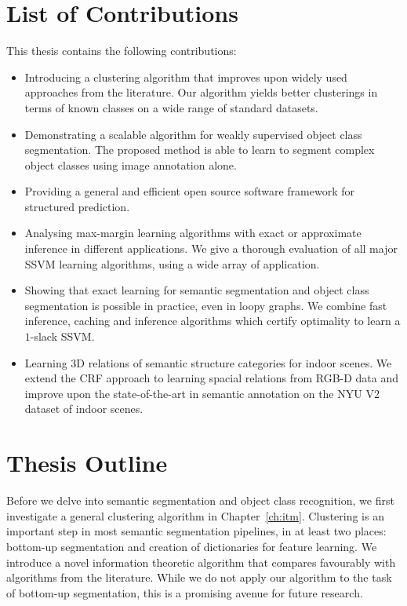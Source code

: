 \section{List of Contributions}
This thesis contains the following contributions:
\begin{itemize}
\item Introducing a clustering algorithm that improves upon widely used
    approaches from the literature. Our algorithm yields better clusterings in
    terms of known classes on a wide range of standard datasets.
\item Demonstrating a scalable algorithm for weakly supervised object class
    segmentation.  The proposed method is able to learn to segment complex object
    classes using image annotation alone.
\item Providing a general and efficient open source software framework for
    structured prediction. 
\item Analysing max-margin learning algorithms with exact or approximate
    inference in different applications. We give a thorough evaluation of
    all major SSVM learning algorithms, using a wide array of application.
\item Showing that exact learning for semantic segmentation and object class
    segmentation is possible in practice, even in loopy graphs. We combine
    fast inference, caching and inference algorithms which certify optimality
    to learn a $1$-slack SSVM.
\item Learning 3D relations of semantic structure categories for indoor scenes.
    We extend the CRF approach to learning spacial relations from RGB-D data and
    improve upon the state-of-the-art in semantic annotation on the NYU V2 dataset
    of indoor scenes.
\end{itemize}

\section{Thesis Outline}
Before we delve into semantic segmentation and object class recognition, we
first investigate a general clustering algorithm in Chapter~\ref{ch:itm}.
Clustering is an important step in most semantic segmentation pipelines, in at
least two places: bottom-up segmentation and creation of dictionaries for
feature learning. We introduce a novel information theoretic algorithm that
compares favourably with algorithms from the literature.  While we do not apply
our algorithm to the task of bottom-up segmentation, this is a promising avenue
for future research.

